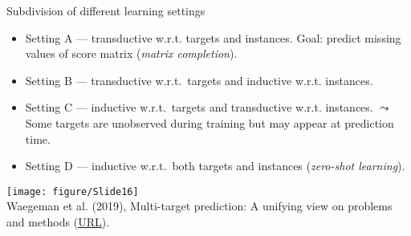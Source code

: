 \documentclass[11pt,compress,t,notes=noshow, xcolor=table]{beamer}
\begin{document}
\begin{frame}{Subdivision of different learning settings}

	\begin{itemize}
		\item Setting A --- transductive w.r.t. targets and instances. Goal: predict missing values of score matrix (\emph{matrix completion}).

		\item Setting B --- transductive w.r.t.\ targets and inductive w.r.t. instances.

	\end{itemize}

	\begin{minipage}{0.55\textwidth}
		\begin{itemize}
			\item Setting C --- inductive w.r.t.\ targets and transductive w.r.t. instances. $\leadsto$ Some targets are unobserved during training but may appear at prediction time.

			\item Setting D --- inductive w.r.t.\ both targets and instances (\emph{zero-shot learning}).
            
		\end{itemize}
	\end{minipage}
    \hfill
	\begin{minipage}{0.4\textwidth}
	   \center
	   \texttt{[image: figure/Slide16]}  \tiny
	   \\ Waegeman et al. (2019), Multi-target prediction: A unifying view on problems and methods (\href{https://arxiv.org/pdf/1809.02352.pdf}{\underline{URL}}).
	\end{minipage}
\end{frame}



%
\endlecture
\end{document}
